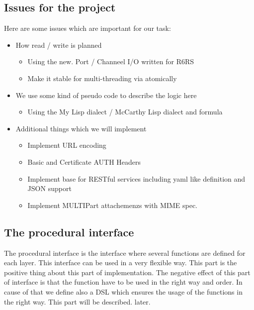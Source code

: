 \documentclass[10pt,a4paper,english]{article}
\begin{document}
\begin{multicols}{2}
\subsection{Issues for the project}
\begin{flushleft}
Here are some issues  which are important for our task:
 \begin{itemize}
 \item{How read / write is planned}
    \begin{itemize}
        \item{Using the new. Port / Channeel I/O written for R6RS}
        \item{Make it stable for multi-threading via atomically}        
    \end{itemize}
\item{We use some kind of pseudo code to describe the logic here}
   \begin{itemize}
        \item{Using the My Lisp dialect / McCarthy Lisp dialect and formula}
    \end{itemize}
\item{Additional things which we will implement}
    \begin{itemize}
       \item{Implement URL encoding}
       \item{Basic and Certificate AUTH Headers} 
       \item{Implement base for RESTful services including yaml like definition and JSON support}
       \item{Implement MULTIPart attachemenzs with MIME spec.}
   \end{itemize}
\end{itemize}
\end{flushleft}


\subsection{The procedural interface}
\begin{flushleft}
The procedural interface is the interface where several functions are defined for each layer. This interface can be used in a very flexible way. This part is the positive thing about this part of implementation. The negative effect of this part of interface is that the function have to be used in the right way and order. In cause of that we define also a DSL which ensures the usage of the functions in the right way. This part will be described. later. 
\end{flushleft}



\end{multicols}
\end{document}
